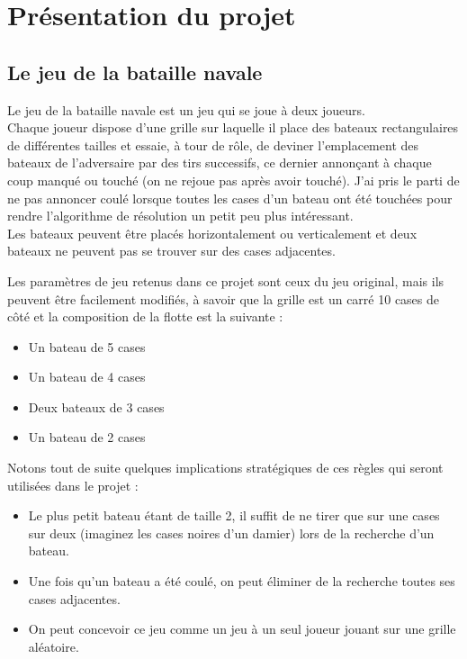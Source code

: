 \chapter{Présentation du projet}

\section{Le jeu de la bataille navale}
Le jeu de la bataille navale est un jeu qui se joue à deux joueurs.\\
Chaque joueur dispose d'une grille sur laquelle il place des bateaux rectangulaires de différentes tailles et essaie, à tour de rôle, de deviner l'emplacement des bateaux de l'adversaire par des tirs successifs, ce dernier annonçant à chaque coup \og manqué \fg{} ou \og touché \fg{} (on ne rejoue pas après avoir touché). J'ai pris le parti de ne pas annoncer \og coulé \fg{} lorsque toutes les cases d'un bateau ont été touchées pour rendre l'algorithme de résolution un petit peu plus intéressant.\\
Les bateaux peuvent être placés horizontalement ou verticalement et deux bateaux ne peuvent pas se trouver sur des cases adjacentes.

Les paramètres de jeu retenus dans ce projet sont ceux du jeu original, mais ils peuvent être facilement modifiés, à savoir que la grille est un carré 10 cases de côté et la composition de la flotte est la suivante :
\begin{itemize}
\item Un bateau de 5 cases
\item Un bateau de 4 cases
\item Deux bateaux de 3 cases
\item Un bateau de 2 cases
\end{itemize}

\medskip

Notons tout de suite quelques implications stratégiques de ces règles qui seront utilisées dans le projet :
\begin{itemize}
\item Le plus petit bateau étant de taille 2, il suffit de ne tirer que sur une cases sur deux (imaginez les cases noires d'un damier) lors de la recherche d'un bateau.
\item Une fois qu'un bateau a été coulé, on peut éliminer de la recherche toutes ses cases adjacentes.
\item On peut concevoir ce jeu comme un jeu à un seul joueur jouant sur une grille aléatoire.
\end{itemize}

